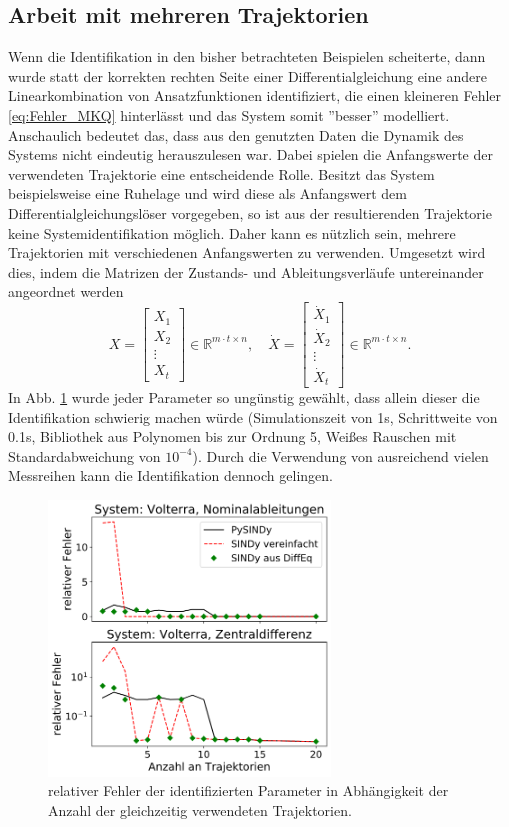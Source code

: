 \subsection{Arbeit mit mehreren Trajektorien}
Wenn die Identifikation in den bisher betrachteten Beispielen scheiterte, dann wurde statt der korrekten rechten Seite einer Differentialgleichung eine andere Linearkombination von Ansatzfunktionen identifiziert, die einen kleineren Fehler \eqref{eq:Fehler_MKQ} hinterlässt und das System somit ''besser'' modelliert. Anschaulich bedeutet das, dass aus den genutzten Daten die Dynamik des Systems nicht eindeutig herauszulesen war. Dabei spielen die Anfangswerte der verwendeten Trajektorie eine entscheidende Rolle. Besitzt das System beispielsweise eine Ruhelage und wird diese als Anfangswert dem Differentialgleichungslöser vorgegeben, so ist aus der resultierenden Trajektorie keine Systemidentifikation möglich. Daher kann es nützlich sein, mehrere Trajektorien mit verschiedenen Anfangswerten zu verwenden. Umgesetzt wird dies, indem die Matrizen der Zustands- und Ableitungsverläufe untereinander angeordnet werden
\begin{equation}
X = \begin{bmatrix}
		X_1 \\
		X_2 \\
		\vdots   \\ 
		X_t
	\end{bmatrix} \in \mathbb{R}^{m\cdot t\times n},\quad
	\dot{X} = \begin{bmatrix}
			\dot{X}_1 \\
			\dot{X}_2 \\
			\vdots   \\ 
			\dot{X}_t
		\end{bmatrix} \in \mathbb{R}^{m\cdot t\times n}.
\end{equation}
In Abb. \ref{fig:errors_no_tr} wurde jeder Parameter so ungünstig gewählt, dass allein dieser die Identifikation schwierig machen würde (Simulationszeit von 1s, Schrittweite von 0.1s, Bibliothek aus Polynomen bis zur Ordnung 5, Weißes Rauschen mit Standardabweichung von $10^{-4}$). Durch die Verwendung von ausreichend vielen Messreihen kann die Identifikation dennoch gelingen.
\begin{figure}[h!] %
	\centering
	\includegraphics[width=75mm]{images/errors_volterra_no_tr_variation2.png}
	\caption{relativer Fehler der identifizierten Parameter in Abhängigkeit der Anzahl der gleichzeitig verwendeten Trajektorien.}
	\label{fig:errors_no_tr}
\end{figure}
